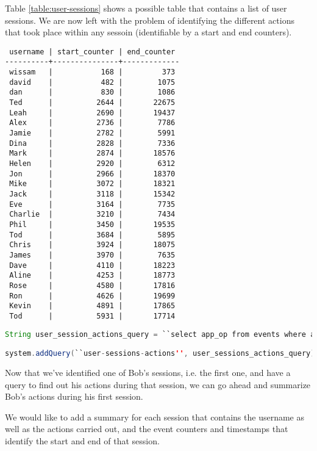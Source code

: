 Table \ref{table:user-sessions} shows a possible table that contains a list of user sessions. We are now left with the problem of identifying the different actions that took place within any sessoin (identifiable by a start and end counters).

\begin{table}
\begin{verbatim}
 username | start_counter | end_counter 
----------+---------------+-------------
 wissam   |           168 |         373
 david    |           482 |        1075
 dan      |           830 |        1086
 Ted      |          2644 |       22675
 Leah     |          2690 |       19437
 Alex     |          2736 |        7786
 Jamie    |          2782 |        5991
 Dina     |          2828 |        7336
 Mark     |          2874 |       18576
 Helen    |          2920 |        6312
 Jon      |          2966 |       18370
 Mike     |          3072 |       18321
 Jack     |          3118 |       15342
 Eve      |          3164 |        7735
 Charlie  |          3210 |        7434
 Phil     |          3450 |       19535
 Tod      |          3684 |        5895
 Chris    |          3924 |       18075
 James    |          3970 |        7635
 Dave     |          4110 |       18223
 Aline    |          4253 |       18773
 Rose     |          4580 |       17816
 Ron      |          4626 |       19699
 Kevin    |          4891 |       17865
 Tod      |          5931 |       17714
\end{verbatim}
\caption*{User Sessions Table}
\caption[User Sessions]{This table shows start and end event counters for different user sessions. Start and end times are omitted for simplicity.}
\label{table:user-sessions}
\end{table}

\begin{lstlisting}[language=Java]
String user_session_actions_query = ``select app_op from events where app_op like 'mint-user-\%' and to_array(app_args)[0] = ? and event_counter > ? and event_counter < ?'';

system.addQuery(``user-sessions-actions'', user_sessions_actions_query);
\end{lstlisting}

Now that we've identified one of Bob's sessions, i.e. the first one, and have a query to find out his actions during that session, we can go ahead and summarize Bob's actions during his first session.

We would like to add a summary for each session that contains the username as well as the actions carried out, and the event counters and timestamps that identify the start and end of that session.

